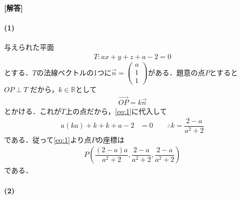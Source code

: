 \documentclass[../../main.tex]{subfiles}
\begin{document}
\begin{oframed}
  
\end{oframed}

{\bf [解答]}

\paragraph{(1)}

与えられた平面
\begin{align}
  T: ax+y+z+a-2=0
\end{align}
とする．$T$の法線ベクトルの1つに$\vec{n} =
\begin{pmatrix} a \\ 1 \\ 1
\end{pmatrix}$がある．題意の点$P$とすると $OP \perp T$ だから，$k \in \mathbb{R}$として
\begin{align}
  \overrightarrow{OP} = k\vec{n} \label{eq:1}
\end{align}
とかける．これが$T$上の点だから，\cref{eq:1}に代入して
\begin{align}
  a(ka) + k + k + a-2 &= 0 \qquad \therefore k = \dfrac{2-a}{a^2+2}
\end{align}
である．従って\cref{eq:1}より点$P$の座標は
\begin{align}
  P\left( \dfrac{(2-a)a}{a^2+2}, \dfrac{2-a}{a^2+2}, \dfrac{2-a}{a^2+2} \right)
\end{align}
である．

\paragraph{(2)}
\end{document}
